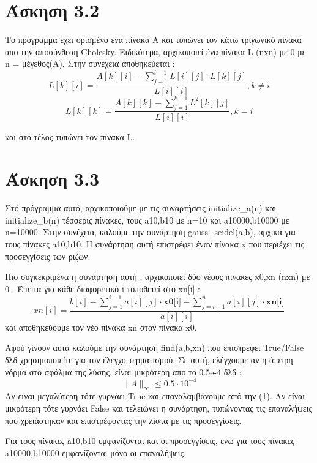 \documentclass{article}
\begin{document}
    \section{Άσκηση 3.2}
    
    Το πρόγραμμα έχει ορισμένο ένα πίνακα Α και τυπώνει τον κάτω τριγωνικό πίνακα απο την αποσύνθεση Cholesky.
    Ειδικότερα, αρχικοποιεί ένα πίνακα L (nxn) με 0 με n = μέγεθος(Α). Στην συνέχεια αποθηκεύεται : 
    \begin{equation*}
        L[k][i] = \frac{A[k][i] - \sum_{j=1}^{i-1}L[i][j] \cdot L[k][j]}{L[i][i]} , k\neq i
    \end{equation*}
    \begin{equation*}
        L[k][k] = \frac{A[k][k] - \sum_{j=1}^{k-1} L^2[k][j]}{L[i][i]} , k=i 
    \end{equation*}
    
    και στο τέλος τυπώνει τον πίνακα L.
    
    \section{Άσκηση 3.3}
    
    Στό πρόγραμμα αυτό, αρχικοποιούμε με τις συναρτήσεις initialize\_a(n) και initialize\_b(n)
    τέσσερις πίνακες, τους a10,b10 με n=10 και a10000,b10000 με n=10000.
    Στην συνέχεια, καλούμε την συνάρτηση gauss\_seidel(a,b), αρχικά για τους πίνακες a10,b10.
    Η συνάρτηση αυτή επιστρέφει έναν πίνακα x που περιέχει τις προσεγγίσεις των ριζών.
    
    Πιο συγκεκριμένα η συνάρτηση αυτή , αρχικοποιεί δύο νέους πίνακες x0,xn (nxn) με 0 . Έπειτα για κάθε διαφορετικό i τοποθετεί στο xn[i] : 
    \begin{equation}
        xn[i] = \frac{b[i]-\sum_{j=1}^{i-1}a[i][j]\cdot \textbf{x0[i]} - \sum_{j=i+1}^{n}a[i][j]\cdot \textbf{xn[i]}}{a[i][i]}
    \end{equation}
    και αποθηκεύουμε τον νέο πίνακα xn στον πίνακα x0.
    
    Aφού γίνουν αυτά καλούμε την συνάρτηση find(a,b,xn) που επιστρέφει True/False 
    δλδ χρησιμοποιείτε για τον έλεγχο τερματισμού. 
    Σε αυτή, ελέγχουμε αν η άπειρη νόρμα στο σφάλμα της λύσης, είναι μικρότερη απο το 0.5e-4 δλδ : 
    \begin{equation*}
        \big\|A\big\|_\infty \leq 0.5\cdot10^{-4}
    \end{equation*}
    Αν είναι μεγαλύτερη τότε γυρνάει True και επαναλαμβάνουμε από την (1). Αν είναι μικρότερη τότε γυρνάει False και τελειώνει η συνάρτηση, τυ\-πώ\-νο\-ντας τις επαναλήψεις που χρειάστηκαν και επιστρέφοντας την λίστα με τις προσεγγίσεις.
    
    Για τους πίνακες a10,b10 εμφανίζονται και οι προσεγγίσεις, ενώ για τους πίνακες a10000,b10000 εμφανίζονται μόνο οι επαναλήψεις.
    
\end{document}

